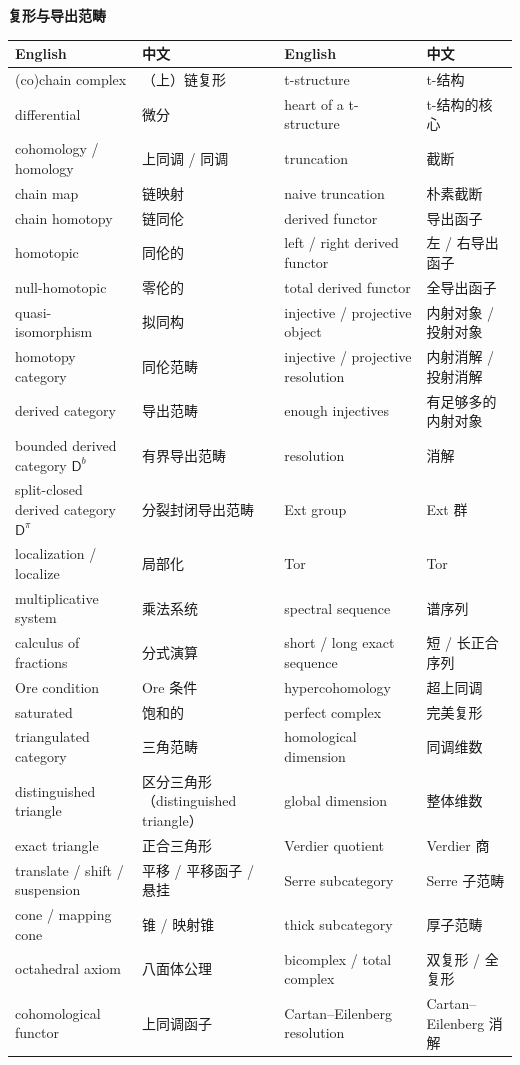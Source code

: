 \vspace{0.8em}
\noindent\textbf{复形与导出范畴}\par\nobreak
\vspace{0.3em}
{\small
\begin{longtable}{p{}p{}p{}p{}}
\toprule
English & 中文 & English & 中文 \\
\midrule
\endhead
(co)chain complex & （上）链复形 & t-structure & t-结构\\
differential & 微分 & heart of a t-structure & t-结构的核心\\
cohomology / homology & 上同调 / 同调 & truncation & 截断\\
chain map & 链映射 & naive truncation & 朴素截断\\
chain homotopy & 链同伦 & derived functor & 导出函子\\
homotopic & 同伦的 & left / right derived functor & 左 / 右导出函子\\
null-homotopic & 零伦的 & total derived functor & 全导出函子\\
quasi-isomorphism & 拟同构 & injective / projective object & 内射对象 / 投射对象\\
homotopy category & 同伦范畴 & injective / projective resolution & 内射消解 / 投射消解\\
derived category & 导出范畴 & enough injectives & 有足够多的内射对象\\
bounded derived category $\mathsf{D}^b$ & 有界导出范畴 & resolution & 消解\\
split-closed derived category $\mathsf{D}^\pi$ & 分裂封闭导出范畴 & Ext group & Ext 群\\
localization / localize & 局部化 & Tor & Tor\\
multiplicative system & 乘法系统 & spectral sequence & 谱序列\\
calculus of fractions & 分式演算 & short / long exact sequence & 短 / 长正合序列\\
Ore condition & Ore 条件 & hypercohomology & 超上同调\\
saturated & 饱和的 & perfect complex & 完美复形\\
triangulated category & 三角范畴 & homological dimension & 同调维数\\
distinguished triangle & 区分三角形（distinguished triangle） & global dimension & 整体维数\\
exact triangle & 正合三角形 & Verdier quotient & Verdier 商\\
translate / shift / suspension & 平移 / 平移函子 / 悬挂 & Serre subcategory & Serre 子范畴\\
cone / mapping cone & 锥 / 映射锥 & thick subcategory & 厚子范畴\\
octahedral axiom & 八面体公理 & bicomplex / total complex & 双复形 / 全复形\\
cohomological functor & 上同调函子 & Cartan–Eilenberg resolution & Cartan–Eilenberg 消解\\
\bottomrule
\end{longtable}}

